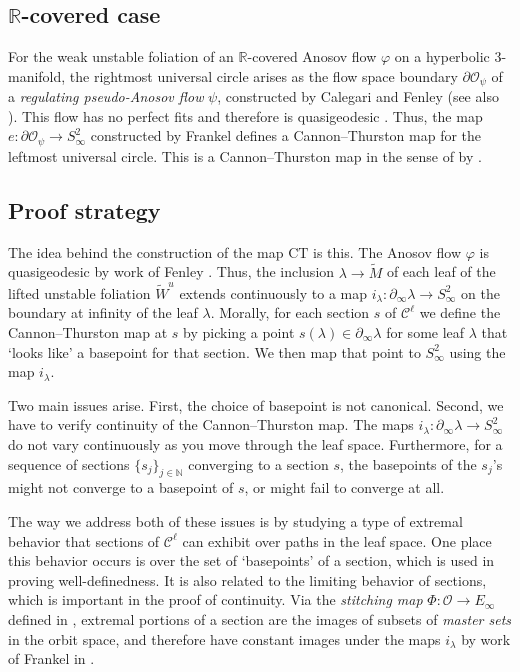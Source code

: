 \documentclass[11pt]{amsart}
\newcommand{\R}{\mathbb{R}}
\renewcommand{\l}{\lambda}
\newcommand{\wt}{\widetilde}
\newcommand{\mc}{\mathcal}
\newcommand{\N}{\mathbb{N}}
\newcommand{\orb}{\mathcal{O}}
\renewcommand{\phi}{\varphi}
\newcommand{\ct}{\mathrm{CT}}
\numberwithin{equation}{section}
\theoremstyle{definition}
\begin{document}
\subsection*{$\R$-covered case}
For the weak unstable foliation of an $\R$-covered Anosov flow $\phi$ on a hyperbolic 3-manifold, the rightmost universal circle arises as the flow space boundary $\partial\orb_\psi$ of a \emph{regulating pseudo-Anosov flow} $\psi$, constructed by Calegari \cite[Corollary 5.3.16]{Calegari2000Rcovered} and Fenley \cite{fenley2012ideal} (see also \cite[Section 6]{buckminster2025universal}). This flow has no perfect fits \cite[Theorem G]{fenley2012ideal} and therefore is quasigeodesic \cite[Main Theorem]{Fen16}. Thus, the map $e\colon\partial\orb_\psi\to S^2_\infty$ constructed by Frankel \cite{frankel2015quasigeodesic} defines a Cannon--Thurston map for the leftmost universal circle. This is a Cannon--Thurston map in the sense of  by \cite{LT}.

\subsection*{Proof strategy}
The idea behind the construction of the map $\ct$ is this. The Anosov flow $\varphi$ is quasigeodesic by work of Fenley \cite{fenley2022nonrcoveredanosovflows}. Thus, the inclusion $\l\to \wt M$ of each leaf of the lifted unstable foliation $\wt W^u$ extends continuously to a map $i_\l\colon\partial_\infty\l\to S^2_\infty$ on the boundary at infinity of the leaf $\l$. Morally, for each section $s$ of $\mc C^\ell$ we define the Cannon--Thurston map at $s$ by picking a point $s(\l)\in\partial_\infty\l$ for some leaf  $\l$ that `looks like' a basepoint for that section. We then map that point to $S^2_\infty$ using the map $i_\l$. 

Two main issues arise. First, the choice of basepoint is not canonical. Second, we have to verify continuity of the Cannon--Thurston map. The maps $i_\l\colon\partial_\infty\l\to S^2_\infty$ do not vary continuously as you move through the leaf space. Furthermore, for a sequence of sections $\{s_j\}_{j\in\N}$ converging to a section $s$, the basepoints of the $s_j$'s might not converge to a basepoint of $s$, or might fail to converge at all. 

The way we address both of these issues is by studying a type of extremal behavior that sections of $\mc C^\ell$ can exhibit over paths in the leaf space. One place this behavior occurs is over the set of `basepoints' of a section, which is used in proving well-definedness. It is also related to the limiting behavior of sections, which is important in the proof of continuity. Via the \emph{stitching map} $\Phi\colon\orb\to E_\infty$ defined in \cite{buckminster2025universal}, extremal portions of a section are the images of subsets of \emph{master sets} in the orbit space, and therefore have constant images under the maps $i_\l$ by work of Frankel in \cite{frankel_closedorbits}.
\end{document}
